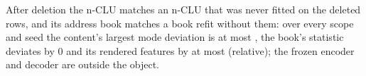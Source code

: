 After deletion the n-CLU matches an n-CLU that was never fitted on the deleted rows, and its address %
book matches a book refit without them: over every scope and seed the content's largest mode
deviation is at most , the book's statistic deviates by 0 and its rendered features by %
at most  (relative); the frozen encoder and decoder are outside the object. %
